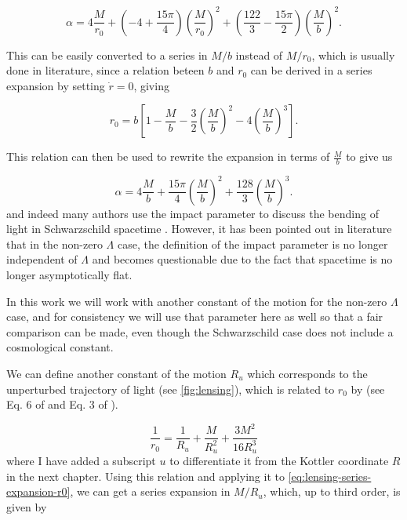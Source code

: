 \begin{equation}
  \alpha = 4 \frac{M}{r_0} + \left ( -4 + \frac{15\pi}{4} \right )\left ( \frac{M}{r_0}\right )^2 + \left ( \frac{122}{3} - \frac{15\pi}{2} \right )\left ( \frac{M}{b}\right )^2.
  \label{eq:lensing-series-expansion-r0}
\end{equation}

This can be easily converted to a series in $M/b$ instead of $M/r_0$, which is usually done in literature, since a relation beteen $b$ and $r_0$ can be derived in a series expansion by setting $\dot{r} = 0$, giving \citep{keeton2005formalism}

\begin{equation}
  r_0 = b \left [ 1 - \frac{M}{b} - \frac{3}{2} \left ( \frac{M}{b}\right)^2 - 4\left ( \frac{M}{b}\right)^3 \right ].
  \label{eq:b-r0-relation}
\end{equation} 

This relation can then be used to rewrite the expansion in terms of $\frac{M}{b}$ to give us

\begin{equation}
  \alpha = 4 \frac{M}{b} + \frac{15\pi}{4} \left ( \frac{M}{b} \right )^2 + \frac{128}{3} \left ( \frac{M}{b} \right )^3.
  \label{eq:series-expansion-b}
\end{equation}
and indeed many authors use the impact parameter to discuss the bending of light in Schwarzschild spacetime \citep{wald2010general,misner2017gravitation,butcher2016no}. However, it has been pointed out in literature \citep{ishak2008new,hammad2013note,lebedev2013influence} that in the non-zero $\Lambda$ case, the definition of the impact parameter is no longer independent of $\Lambda$ and becomes questionable due to the fact that spacetime is no longer asymptotically flat. 

In this work we will work with another constant of the motion for the non-zero $\Lambda$ case, and for consistency we will use that parameter here as well so that a fair comparison can be made, even though the Schwarzschild case does not include a cosmological constant.

We can define another constant of the motion $R_u$ which corresponds to the unperturbed trajectory of light (see \autoref{fig:lensing}), which is related to $r_0$ by (see Eq. 6 of \citet{ishak2008new} and Eq. 3 of \citet{butcher2016no}).

\begin{equation}
  \frac{1}{r_0} = \frac{1}{R_u} + \frac{M}{R_u^2} + \frac{3M^2}{16R_u^3}
  \label{eq:r0-R-relation}
\end{equation}
where I have added a subscript $u$ to differentiate it from the Kottler coordinate $R$ in the next chapter. Using this relation and applying it to \autoref{eq:lensing-series-expansion-r0}, we can get a series expansion in $M/R_u$, which, up to third order, is given by

